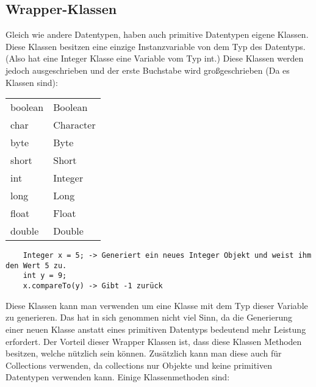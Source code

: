 \documentclass{article}
\begin{document}
	\subsection{Wrapper-Klassen}
	Gleich wie andere Datentypen, haben auch primitive Datentypen eigene Klassen. Diese Klassen besitzen eine einzige Instanzvariable von dem Typ des Datentyps. (Also hat eine Integer Klasse eine Variable vom Typ int.) Diese Klassen werden jedoch ausgeschrieben und der erste Buchstabe wird großgeschrieben (Da es Klassen sind): \\
	\begin{tabular}{l | l}
	boolean & Boolean \\
	char & Character \\
	byte & Byte \\
	short & Short \\
	int & Integer \\
	long & Long \\
	float & Float \\
	double & Double \\
	\end{tabular}
	\begin{verbatim}
	Integer x = 5; -> Generiert ein neues Integer Objekt und weist ihm den Wert 5 zu.
	int y = 9;
	x.compareTo(y) -> Gibt -1 zurück
	\end{verbatim}
	Diese Klassen kann man verwenden um eine Klasse mit dem Typ dieser Variable zu generieren. Das hat in sich genommen nicht viel Sinn, da die Generierung einer neuen Klasse anstatt eines primitiven Datentyps bedeutend mehr Leistung erfordert. Der Vorteil dieser Wrapper Klassen ist, dass diese Klassen Methoden besitzen, welche nützlich sein können. Zusätzlich kann man diese auch für Collections verwenden, da collections nur Objekte und keine primitiven Datentypen verwenden kann. Einige Klassenmethoden sind:
\end{document}
